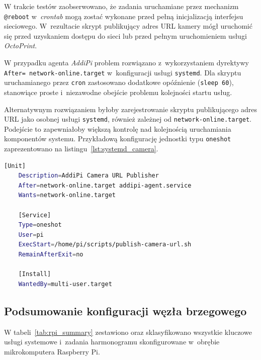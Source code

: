 \documentclass[a4paper,12pt,reqno]{article}
\begin{document}
W trakcie testów zaobserwowano, że zadania uruchamiane przez mechanizm \texttt{@reboot} w~\textit{crontab} mogą zostać wykonane przed pełną inicjalizacją interfejsu sieciowego. W~rezultacie skrypt publikujący adres URL kamery mógł uruchomić się przed uzyskaniem dostępu do sieci lub przed pełnym uruchomieniem usługi \textit{OctoPrint}.

W przypadku agenta \textit{AddiPi} problem rozwiązano z~wykorzystaniem dyrektywy \texttt{After= network-online.target} w~konfiguracji usługi \texttt{systemd}. Dla skryptu uruchamianego przez \texttt{cron} zastosowano dodatkowe opóźnienie (\texttt{sleep 60}), stanowiące proste i~niezawodne obejście problemu kolejności startu usług.

Alternatywnym rozwiązaniem byłoby zarejestrowanie skryptu publikującego adres URL jako osobnej usługi \texttt{systemd}, również zależnej od \texttt{network-online.target}. Podejście to zapewniałoby większą kontrolę nad kolejnością uruchamiania komponentów systemu. Przykładową konfigurację jednostki typu \texttt{oneshot} zaprezentowano na listingu~\ref{lst:systemd_camera}.

\begin{lstlisting}[language=bash,caption={Alternatywna konfiguracja skryptu publikacji jako uslugi systemd.}, label=lst:systemd_camera]
	[Unit]
	Description=AddiPi Camera URL Publisher
	After=network-online.target addipi-agent.service
	Wants=network-online.target
	
	[Service]
	Type=oneshot
	User=pi
	ExecStart=/home/pi/scripts/publish-camera-url.sh
	RemainAfterExit=no
	
	[Install]
	WantedBy=multi-user.target
\end{lstlisting}

\subsection{Podsumowanie konfiguracji węzła brzegowego}

W tabeli~\ref{tab:rpi_summary} zestawiono oraz sklasyfikowano wszystkie kluczowe usługi systemowe i~zadania harmonogramu skonfigurowane w~obrębie mikrokomputera Raspberry Pi.
\end{document}
